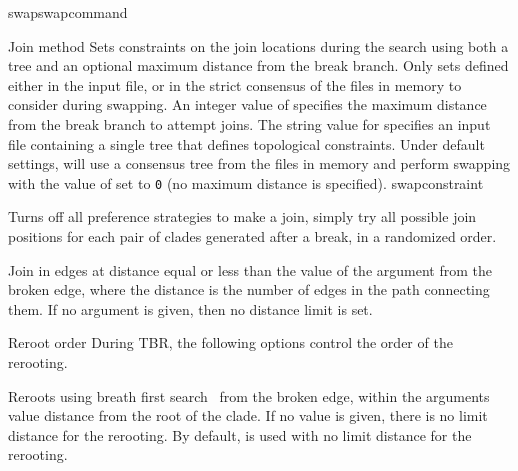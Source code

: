 \begin{command}{swap}{swapcommand}
\begin{arguments}
\begin{argumentgroup}{Join method}
                {Sets constraints on the join locations during the search
                using both a tree and an optional maximum distance from the
                break branch. Only sets defined either in the input file, or
                in the strict consensus of the files in memory to consider
                during swapping. An integer value of 
                specifies the maximum distance from the break branch to
                attempt joins. The string value for 
                specifies an input file containing a single tree that
                defines topological constraints. Under default settings,
                 will use a consensus tree from the
                files in memory and perform swapping with the value of
                 set to \texttt{0} (no maximum distance
                is specified).}
                {swapconstraint}

                {Turns off all preference strategies to make a join, simply try
                all possible join positions for each pair of clades generated
                after a break, in a randomized order.}
                {}

                {Join in edges at distance equal or less than the value of the argument
                from the broken edge, where the distance is the number of edges
                in the path connecting them. If no argument is given, then no
                distance limit is set.}
                {}
            
        \end{argumentgroup}

        \begin{argumentgroup}{Reroot order}
            {During TBR, the following options control the order of the rerooting.}

                {Reroots using breath first search~\cite{cormen2001} from the broken edge, within the
                arguments value distance from the root of the clade. If no value is
                given, there is no limit distance for the rerooting. By default, 
                is used with no limit distance for the rerooting.}
                {}


\end{argumentgroup}
\end{arguments}
\end{command}
